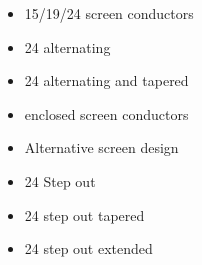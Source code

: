 \begin{figure}
\label{fig:24-alternating-length}
\end{figure}
\begin{figure}
\label{fig:24-tapered-length}
\end{figure}
\begin{figure}
\label{fig:24-alternating-tapered}
\end{figure}
\begin{figure}
\label{fig:24-enclosed-slots}
\end{figure}
\begin{figure}
\label{fig:alt-screen-design}
\end{figure}
\begin{figure}
\label{fig:24-step-out}
\end{figure}
\begin{figure}
\label{fig:24-step-out-slight}
\end{figure}
\begin{figure}
\label{fig:24-final-design}
\end{figure}

\begin{itemize}
\item{15/19/24 screen conductors}
\item{24 alternating}
\item{24 alternating and tapered}
\item{enclosed screen conductors}
\item{Alternative screen design}
\item{24 Step out}
\item{24 step out tapered}
\item{24 step out extended}
\end{itemize}